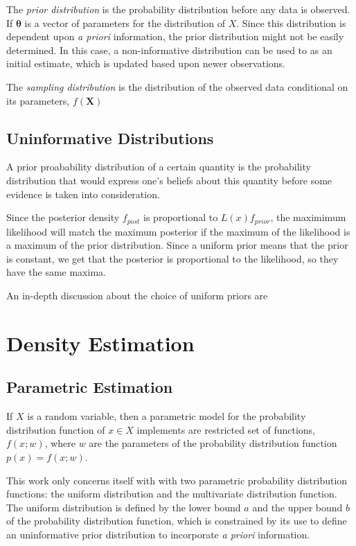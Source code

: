 The \emph{prior distribution} is the probability distribution before any data is observed.  If $\bm{\theta}$ is a vector of parameters for the distribution of $X$.   Since this distribution is dependent upon \emph{a priori} information, the prior distribution might not be easily determined.  In this case, a non-informative distribution can be used to as an initial estimate, which is updated based upon newer observations.

The \emph{sampling distribution} is the distribution of the observed data conditional on its parameters, $f(\bm{X})$

\subsection{Uninformative Distributions}
\label{section:bayes_prior}
A prior proabability distribution of a certain  quantity is the probability distribution that would express one's beliefs about this quantity before some evidence is taken into consideration.

Since the posterior density $f_{post}$ is proportional to $L(x)f_{prior}$, the maximimum likelihood will match the maximum posterior if the maximum of the likelihood is a maximum of the prior distribution.  Since a uniform prior means that the prior is constant, we get that the posterior is proportional to the likelihood, so they have the same maxima.

An in-depth discussion about the choice of uniform priors are

\section{Density Estimation}

\subsection{Parametric Estimation}

If $X$ is a random variable, then a parametric model for the probability distribution function of $x \in X$ implements are restricted set of functions, $f(x;w)$, where $w$ are the parameters of the probability distribution function $p(x)=f(x;w)$.

This work only concerns itself with with two parametric probability distribution functions: the uniform distribution and the multivariate distribution function.  The uniform distribution is defined by the lower bound $a$ and the upper bound $b$ of the probability distribution function, which is constrained by its use to define an uninformative prior distribution to incorporate \emph{a priori} information.

